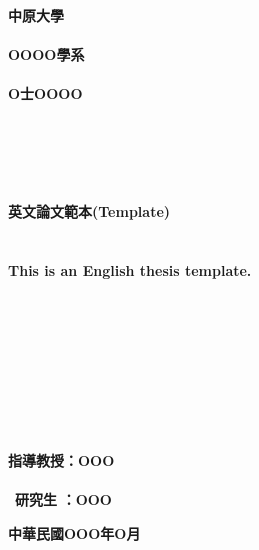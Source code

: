 \sectionfont{\centering}
\begin{center}
    \textbf{\fontsize{24}{32}\selectfont 中原大學}\\
    \textbf{} \\
    \textbf{\fontsize{24}{32}\selectfont OOOO學系}\\
    \textbf{} \\
    \textbf{\fontsize{24}{32}\selectfont O士OOOO}\\
    \textbf{} \\
    \textbf{} \\
    \textbf{} \\ 
    \textbf{} \\
    \textbf{} \\
    \textbf{\fontsize{18}{21.6}\selectfont 英文論文範本(Template)}\\
    \textbf{} \\
    \textbf{} \\
    \textbf{\fontsize{18}{21.6}\selectfont This is an English thesis template.}\\
\end{center}
\begin{center}
    \textbf{} \\ 
    \textbf{} \\
    \textbf{} \\
    \textbf{} \\
    \textbf{} \\
    \textbf{} \\
    \textbf{} \\
    \textbf{} \\
    \textbf{\fontsize{24}{32}\selectfont 指導教授：OOO} \\
    \textbf{} \\
    \textbf{\fontsize{24}{32}\selectfont \,\,\,研究生\,\,：OOO} \\ %
\end{center}
\vfill
\begin{center}
    \textbf{\fontsize{24}{21.6}\selectfont 中華民國OOO年O月} %
\end{center}
\thispagestyle{empty}
\clearpage

